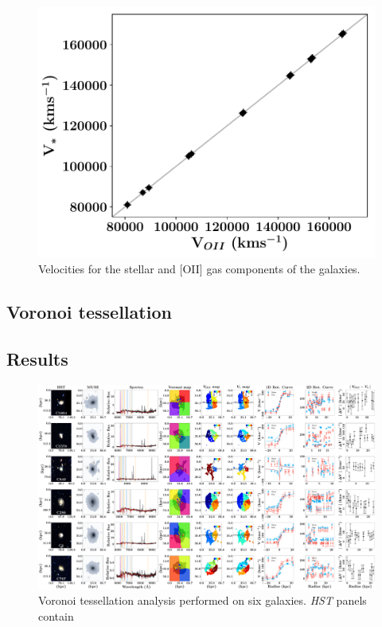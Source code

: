 \documentclass[12pt, twocolumn]{revtex4-1}    %
\begin{document}

\begin{figure}
\includegraphics[width=1.0\linewidth]{data/vel_star_vs_vel_oii}
\caption{Velocities for the stellar and [OII] gas components of the galaxies. }
\label{fig:velocities}
\end{figure}

\subsection{Voronoi tessellation}

\subsection{Results}

\onecolumngrid

\begin{figure}
\centering
\includegraphics[width=1.0\textheight,height=0.6\textwidth]{data/spectra_complete_velocities}
\vspace{1cm}  %
\captionsetup{justification=raggedright}
\caption[Tully-Fisher]{Voronoi tessellation analysis performed on six galaxies. \textit{HST} panels contain  }
\label{fig:multiple_spectra}
\end{figure}
\end{document}
